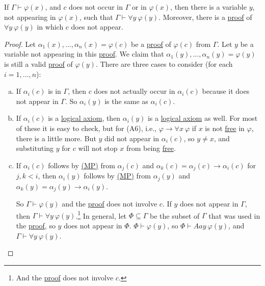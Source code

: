 \begin{lemma}\label{lma:lec8}
	If \(\Gamma \vdash \varphi (x)\), and \(c\) does not occur in \(\Gamma \) or in \(\varphi (x)\), then there is a variable \(y\), not appearing in \(\varphi (x)\), such that \(\Gamma \vdash \forall y\ \varphi (y)\). Moreover, there is a \hyperref[def:proof]{proof} of \(\forall y\ \varphi (y)\) in which \(c\) does not appear.
\end{lemma}
\begin{proof}
	Let \(\alpha _1(x), \ldots , \alpha _n(x) = \varphi (c)\) be a \hyperref[def:proof]{proof} of \(\varphi (c)\) from \(\Gamma \). Let \(y\) be a variable not appearing in this \hyperref[def:proof]{proof}. We claim that \(\alpha _1(y), \ldots , \alpha _n(y) = \varphi (y)\) is still a valid \hyperref[def:proof]{proof} of \(\varphi (y)\). There are three cases to consider (for each \(i = 1, \ldots , n\)):
	\begin{enumerate}[(a)]
		\item If \(\alpha _i(c)\) is in \(\Gamma \), then \(c\) does not actually occur in \(\alpha _i(c)\) because it does not appear in \(\Gamma \). So \(\alpha _i(y)\) is the same as \(\alpha _i(c)\).
		\item If \(\alpha _i(c)\) is a \hyperref[def:logical-axioms]{logical axiom}, then \(\alpha _i(y)\) is a \hyperref[def:logical-axioms]{logical axiom} as well. For most of these it is easy to check, but for (A6), i.e., \(\varphi \to \forall x\ \varphi \) if \(x\) is not \hyperref[def:free-variable]{free} in \(\varphi \), there is a little more. But \(y\) did not appear in \(\alpha _i(c)\), so \(y \neq x\), and substituting \(y\) for \(c\) will not stop \(x\) from being \hyperref[def:free-variable]{free}.
		\item If \(\alpha _i(c)\) follows by \hyperref[def:rule-of-inference]{(MP)} from \(\alpha _j(c)\) and \(\alpha _k(c) = \alpha _j(c) \to  \alpha _i(c)\) for \(j, k < i\), then \(\alpha _i(y)\) follows by \hyperref[def:rule-of-inference]{(MP)} from \(\alpha _j(y)\) and \(\alpha _k(y) = \alpha _j(y) \to  \alpha _i(y)\).

		      So \(\Gamma \vdash \varphi (y)\) and the \hyperref[def:proof]{proof} does not involve \(c\). If \(y\) does not appear in \(\Gamma \), then \(\Gamma \vdash \forall y\ \varphi (y)\).\footnote{And the \hyperref[def:proof]{proof} does not involve \(c\).} In general, let \(\Phi \subseteq \Gamma \) be the subset of \(\Gamma \) that was used in the \hyperref[def:proof]{proof}, so \(y\) does not appear in \(\Phi \). \(\Phi \vdash \varphi (y)\), so \(\Phi \vdash Aay\ \varphi (y)\), and \(\Gamma \vdash \forall y\ \varphi (y)\).
	\end{enumerate}
\end{proof}

